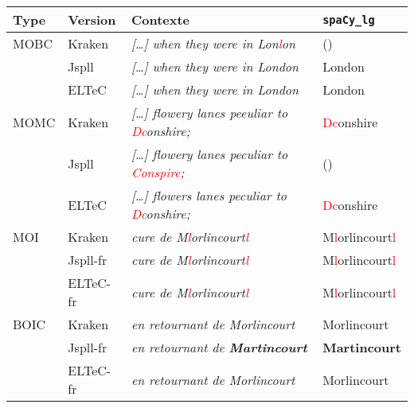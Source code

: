 
\begin{tabular}{|l|l|l|l|}
\hline
Type &Version & Contexte & \texttt{spaCy\_lg} \\
\hline
MOBC &Kraken &\textit{[…] when they were in Lon\textcolor{red}{l}on}&() \\
&Jspll&\textit{[…] when they were in London}&London \\
&ELTeC&\textit{[…] when they were in London}&London \\
\hline
MOMC& Kraken&\textit{[…] flowery
lanes peeuliar to \textcolor{red}{Dc}onshire;}&\textcolor{red}{Dc}onshire \\
&Jspll&\textit{[…] flowery
lanes peculiar to \textcolor{red}{Conspire};}&() \\
&ELTeC&\textit{[…] flowers
lanes peculiar to \textcolor{red}{Dc}onshire;}&\textcolor{red}{Dc}onshire \\
\hline
MOI&Kraken& \textit{cure de M\textcolor{red}{l}orlincourt\textcolor{red}{l}}& M\textcolor{red}{l}orlincourt\textcolor{red}{l} \\
&Jspll-fr&\textit{cure de  M\textcolor{red}{l}orlincourt\textcolor{red}{l}} &   M\textcolor{red}{l}orlincourt\textcolor{red}{l} \\
&ELTeC-fr& \textit{cure de  M\textcolor{red}{l}orlincourt\textcolor{red}{l}}&  M\textcolor{red}{l}orlincourt\textcolor{red}{l} \\
\hline
BOIC&Kraken& \textit{en retournant
de Morlincourt} &Morlincourt \\
&Jspll-fr&\textit{en retournant
de\textbf{ Martincourt}} & \textbf{Martincourt} \\
&ELTeC-fr&\textit{en retournant
de Morlincourt} &Morlincourt \\
\hline
\end{tabular}

